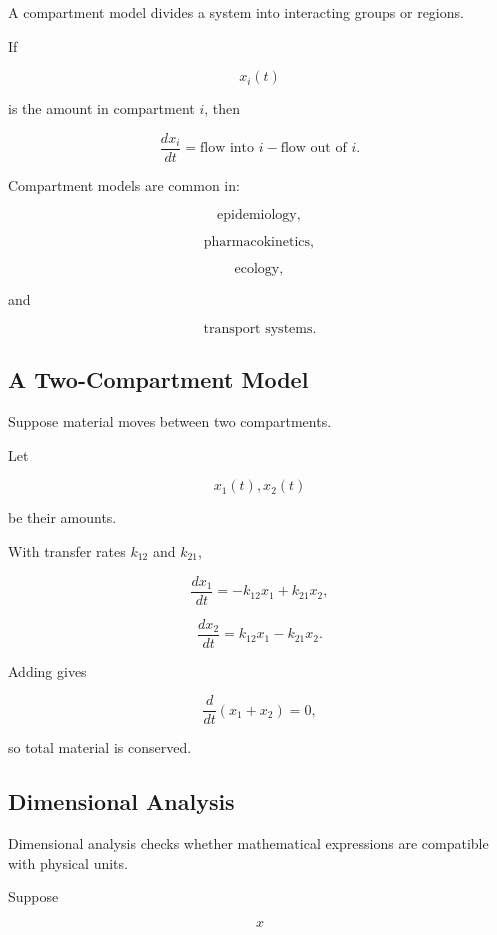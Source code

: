 A compartment model divides a system into interacting groups or regions.

If

\[
x_i(t)
\]

is the amount in compartment \(i\), then

\[
\boxed{
\frac{dx_i}{dt}
=
\text{flow into }i
-
\text{flow out of }i.
}
\]

Compartment models are common in:

\[
\boxed{
\text{epidemiology},
}
\]

\[
\boxed{
\text{pharmacokinetics},
}
\]

\[
\boxed{
\text{ecology},
}
\]

and

\[
\boxed{
\text{transport systems}.
}
\]

\subsection{A Two-Compartment Model}
\label{subsec:two-compartment-model}

Suppose material moves between two compartments.

Let

\[
x_1(t),x_2(t)
\]

be their amounts.

With transfer rates \(k_{12}\) and \(k_{21}\),

\[
\boxed{
\frac{dx_1}{dt}
=
-k_{12}x_1+k_{21}x_2,
}
\]

\[
\boxed{
\frac{dx_2}{dt}
=
k_{12}x_1-k_{21}x_2.
}
\]

Adding gives

\[
\boxed{
\frac{d}{dt}(x_1+x_2)=0,
}
\]

so total material is conserved.

\subsection{Dimensional Analysis}
\label{subsec:dimensional-analysis-modeling}

Dimensional analysis checks whether mathematical expressions are compatible
with physical units.

Suppose

\[
x
\]

